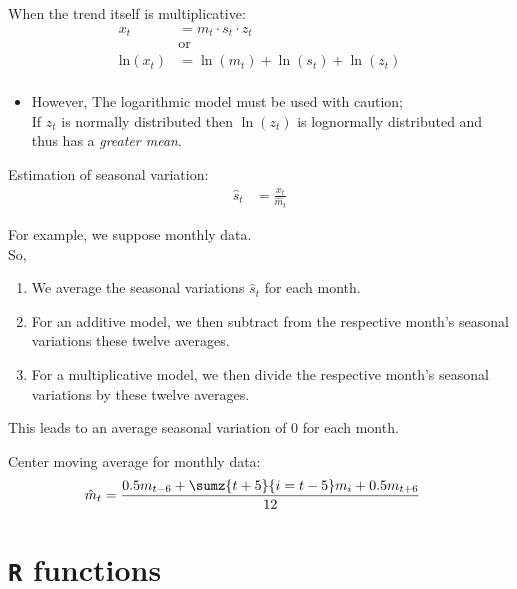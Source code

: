 \documentclass[10pt, french]{article}\usepackage[]{graphicx}\usepackage[]{color}
\begin{document}
\begin{multicols*}{2}
\begin{definitionNOHFILLsub}
When the trend itself is multiplicative:
\begin{align*}
	x_{t}
	&=	m_{t} \cdot s_{t} \cdot z_{t}	\\
	&\text{or}	\\
	\textrm{ln}(x_{t})
	&=	\ln(m_{t}) + \ln(s_{t}) + \ln(z_{t})	\\
\end{align*}
\begin{itemize}
	\item	However, The logarithmic model must be used with caution;\\	
			If $z_{t}$ is normally distributed then $\ln(z_{t})$ is lognormally distributed and thus has a \textit{greater mean}.
\end{itemize}

\tcbline

Estimation of seasonal variation:\\
\begin{align*}
	\hat{s}_{t}
	&=	\frac{x_{t}}{\hat{m}_{t}}
\end{align*}
\end{definitionNOHFILLsub}

\begin{rappel_enhanced}
For example, we suppose monthly data.	\\
So, 
\begin{enumerate}
	\item	We average the seasonal variations $\hat{s}_{t}$ for each month. 
	\item	For an additive model, we then subtract from the respective month's seasonal variations these twelve averages.
	\item	For a multiplicative model, we then divide the respective month's seasonal variations by these twelve averages.
\end{enumerate}
This leads to an average seasonal variation of 0 for each month.
\end{rappel_enhanced}


Center moving average for monthly data:
\begin{align*}
	\hat{m}_{t}
	&=	\frac{0.5 m_{t - 6} + \sumz{t + 5}{i = t - 5} m_{i} + 0.5m_{t + 6}}{12}
\end{align*}
\end{multicols*}

\pagebreak

\part{\texttt{R} functions}
\end{document}
